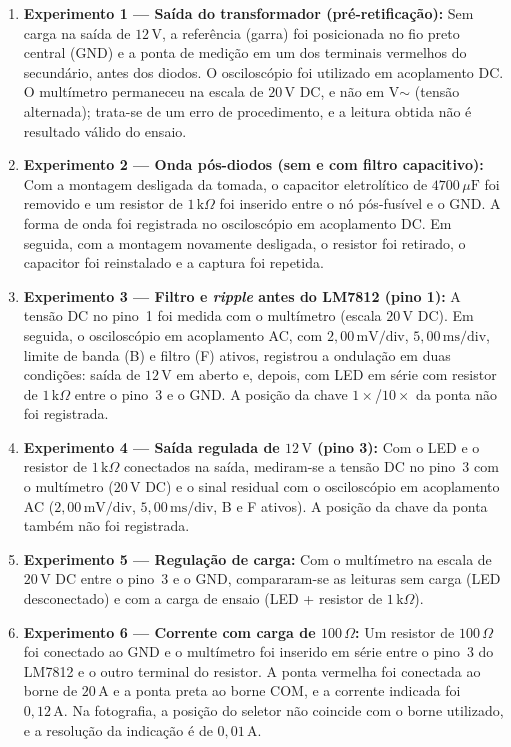 \begin{enumerate}
    \item \textbf{Experimento 1 --- Saída do transformador (pré-retificação):} Sem carga na saída de $12\,\text{V}$, a referência (garra) foi posicionada no fio preto central (GND) e a ponta de medição em um dos terminais vermelhos do secundário, antes dos diodos. O osciloscópio foi utilizado em acoplamento DC. O multímetro permaneceu na escala de $20\,\text{V}$ DC, e não em V$\sim$ (tensão alternada); trata-se de um erro de procedimento, e a leitura obtida não é resultado válido do ensaio.
    \item \textbf{Experimento 2 --- Onda pós-diodos (sem e com filtro capacitivo):} Com a montagem desligada da tomada, o capacitor eletrolítico de $4700\,\mu\text{F}$ foi removido e um resistor de $1\,\text{k}\Omega$ foi inserido entre o nó pós-fusível e o GND. A forma de onda foi registrada no osciloscópio em acoplamento DC. Em seguida, com a montagem novamente desligada, o resistor foi retirado, o capacitor foi reinstalado e a captura foi repetida.
    \item \textbf{Experimento 3 --- Filtro e \textit{ripple} antes do LM7812 (pino 1):} A tensão DC no pino~1 foi medida com o multímetro (escala $20\,\text{V}$ DC). Em seguida, o osciloscópio em acoplamento AC, com $2{,}00\,\text{mV/div}$, $5{,}00\,\text{ms/div}$, limite de banda (B) e filtro (F) ativos, registrou a ondulação em duas condições: saída de $12\,\text{V}$ em aberto e, depois, com LED em série com resistor de $1\,\text{k}\Omega$ entre o pino~3 e o GND. A posição da chave $1\times$/$10\times$ da ponta não foi registrada.
    \item \textbf{Experimento 4 --- Saída regulada de $12\,\text{V}$ (pino 3):} Com o LED e o resistor de $1\,\text{k}\Omega$ conectados na saída, mediram-se a tensão DC no pino~3 com o multímetro ($20\,\text{V}$ DC) e o sinal residual com o osciloscópio em acoplamento AC ($2{,}00\,\text{mV/div}$, $5{,}00\,\text{ms/div}$, B e F ativos). A posição da chave da ponta também não foi registrada.
    \item \textbf{Experimento 5 --- Regulação de carga:} Com o multímetro na escala de $20\,\text{V}$ DC entre o pino~3 e o GND, compararam-se as leituras sem carga (LED desconectado) e com a carga de ensaio (LED + resistor de $1\,\text{k}\Omega$).
    \item \textbf{Experimento 6 --- Corrente com carga de $100\,\Omega$:} Um resistor de $100\,\Omega$ foi conectado ao GND e o multímetro foi inserido em série entre o pino~3 do LM7812 e o outro terminal do resistor. A ponta vermelha foi conectada ao borne de $20\,\text{A}$ e a ponta preta ao borne COM, e a corrente indicada foi $0{,}12\,\text{A}$. Na fotografia, a posição do seletor não coincide com o borne utilizado, e a resolução da indicação é de $0{,}01\,\text{A}$.
\end{enumerate}
